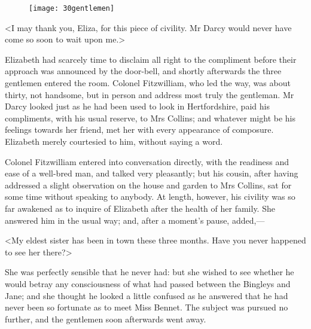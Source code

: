 \begin{figure}[tbh]
\centering
\texttt{[image: 30gentlemen]}
\end{figure}

<I may thank you, Eliza, for this piece of civility. Mr Darcy would never have come so soon to wait upon me.>

Elizabeth had scarcely time to disclaim all right to the compliment before their approach was announced by the door-bell, and shortly afterwards the three gentlemen entered the room. Colonel Fitzwilliam, who led the way, was about thirty, not handsome, but in person and address most truly the gentleman. Mr Darcy looked just as he had been used to look in Hertfordshire, paid his compliments, with his usual reserve, to Mrs Collins; and whatever might be his feelings towards her friend, met her with every appearance of composure. Elizabeth merely courtesied to him, without saying a word.

Colonel Fitzwilliam entered into conversation directly, with the readiness and ease of a well-bred man, and talked very pleasantly; but his cousin, after having addressed a slight observation on the house and garden to Mrs Collins, sat for some time without speaking to anybody. At length, however, his civility was so far awakened as to inquire of Elizabeth after the health of her family. She answered him in the usual way; and, after a moment's pause, added,—

<My eldest sister has been in town these three months. Have you never happened to see her there?>

She was perfectly sensible that he never had: but she wished to see whether he would betray any consciousness of what had passed between the Bingleys and Jane; and she thought he looked a little confused as he answered that he had never been so fortunate as to meet Miss Bennet. The subject was pursued no further, and the gentlemen soon afterwards went away.
